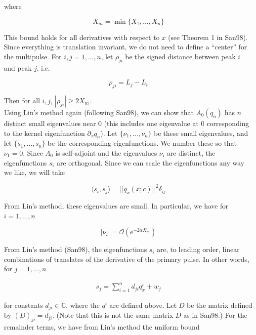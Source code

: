 \documentclass[12pt]{article}
\def\C{{\mathbb C}}
\begin{document}
where

\begin{equation}\label{defXm}
X_m = \min\{X_1, \dots, X_n \}
\end{equation}

This bound holds for all derivatives with respect to $x$ (see Theorem 1 in San98). Since everything is translation invariant, we do not need to define a ``center'' for the multipulse. For $i, j = 1, \dots, n$, let $\rho_{ji}$ be the signed distance between peak $i$ and peak $j$, i.e. 

\begin{equation}\label{rhoji}
\rho_{ji} = L_j - L_i
\end{equation}

Then for all $i, j$, $|\rho_{ji}| \geq 2 X_m$.\\

Using Lin's method again (following San98), we can show that $A_0(q_n)$ has $n$ distinct small eigenvalues near 0 (this includes one eigenvalue at 0 corresponding to the kernel eigenfunction $\partial_x q_n$). Let $\{\nu_1, \dots, \nu_n\}$ be these small eigenvalues, and let $\{s_1, \dots, s_n \}$ be the corresponding eigenfunctions. We number these so that $\nu_1 = 0$. Since $A_0$ is self-adjoint and the eigenvalues $\nu_i$ are distinct, the eigenfunctions $s_i$ are orthogonal. Since we can scale the eigenfunctions any way we like, we will take

\begin{equation}\label{orthonormaleigs}
\langle s_i, s_j \rangle = ||q_x(x; c)||^2 \delta_{ij}
\end{equation}

From Lin's method, these eigenvalues are small. In particular, we have for $i = 1, \dots, n$

\begin{equation}
|\nu_i| = \mathcal{O}(e^{-2 \alpha X_m})
\end{equation}

From Lin's method (San98), the eigenfunctions $s_i$ are, to leading order, linear combinations of translates of the derivative of the primary pulse. In other words, for $j = 1, \dots, n$

\begin{align}\label{sj}
s_j = \sum_{i = 1}^{n} d_{ji} q^i_x + w_j
\end{align}

for constants $d_{ji} \in \C$, where the $q^i$ are defined above. Let $D$ be the matrix defined by $(D)_{ji} = d_{ji}$. (Note that this is not the same matrix $D$ as in San98.) For the remainder terms, we have from Lin's method the uniform bound
\end{document}
